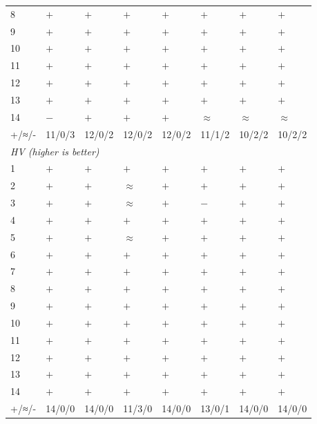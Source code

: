\begin{table}[htbp]
\begin{tabular}{llllllll}
8 & $+$ & $+$ & $+$ & $+$ & $+$ & $+$ & $+$ \\
9 & $+$ & $+$ & $+$ & $+$ & $+$ & $+$ & $+$ \\
10 & $+$ & $+$ & $+$ & $+$ & $+$ & $+$ & $+$ \\
11 & $+$ & $+$ & $+$ & $+$ & $+$ & $+$ & $+$ \\
12 & $+$ & $+$ & $+$ & $+$ & $+$ & $+$ & $+$ \\
13 & $+$ & $+$ & $+$ & $+$ & $+$ & $+$ & $+$ \\
14 & $-$ & $+$ & $+$ & $+$ & $\approx$ & $\approx$ & $\approx$ \\
\hline
+/≈/- & 11/0/3 & 12/0/2 & 12/0/2 & 12/0/2 & 11/1/2 & 10/2/2 & 10/2/2 \\
\hline
\multicolumn{8}{l}{\textit{HV (higher is better)}} \\
1 & $+$ & $+$ & $+$ & $+$ & $+$ & $+$ & $+$ \\
2 & $+$ & $+$ & $\approx$ & $+$ & $+$ & $+$ & $+$ \\
3 & $+$ & $+$ & $\approx$ & $+$ & $-$ & $+$ & $+$ \\
4 & $+$ & $+$ & $+$ & $+$ & $+$ & $+$ & $+$ \\
5 & $+$ & $+$ & $\approx$ & $+$ & $+$ & $+$ & $+$ \\
6 & $+$ & $+$ & $+$ & $+$ & $+$ & $+$ & $+$ \\
7 & $+$ & $+$ & $+$ & $+$ & $+$ & $+$ & $+$ \\
8 & $+$ & $+$ & $+$ & $+$ & $+$ & $+$ & $+$ \\
9 & $+$ & $+$ & $+$ & $+$ & $+$ & $+$ & $+$ \\
10 & $+$ & $+$ & $+$ & $+$ & $+$ & $+$ & $+$ \\
11 & $+$ & $+$ & $+$ & $+$ & $+$ & $+$ & $+$ \\
12 & $+$ & $+$ & $+$ & $+$ & $+$ & $+$ & $+$ \\
13 & $+$ & $+$ & $+$ & $+$ & $+$ & $+$ & $+$ \\
14 & $+$ & $+$ & $+$ & $+$ & $+$ & $+$ & $+$ \\
\hline
+/≈/- & 14/0/0 & 14/0/0 & 11/3/0 & 14/0/0 & 13/0/1 & 14/0/0 & 14/0/0 \\
\hline
\end{tabular}
\end{table}
